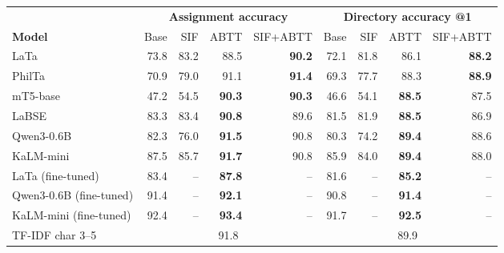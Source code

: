 \begin{table}[t]
\centering
\footnotesize
\setlength{\tabcolsep}{4.5pt}
\begin{tabular}{lrrrrrrrr}
\toprule
& \multicolumn{4}{c}{\textbf{Assignment accuracy}} & \multicolumn{4}{c}{\textbf{Directory accuracy @1}} \\
\cmidrule(lr){2-5}\cmidrule(lr){6-9}
\textbf{Model} & Base & SIF & ABTT & SIF+ABTT & Base & SIF & ABTT & SIF+ABTT \\
\midrule
LaTa & 73.8 & 83.2 & 88.5 & \textbf{90.2} & 72.1 & 81.8 & 86.1 & \textbf{88.2} \\
PhilTa & 70.9 & 79.0 & 91.1 & \textbf{91.4} & 69.3 & 77.7 & 88.3 & \textbf{88.9} \\
mT5-base & 47.2 & 54.5 & \textbf{90.3} & \textbf{90.3} & 46.6 & 54.1 & \textbf{88.5} & 87.5 \\
LaBSE & 83.3 & 83.4 & \textbf{90.8} & 89.6 & 81.5 & 81.9 & \textbf{88.5} & 86.9 \\
Qwen3-0.6B & 82.3 & 76.0 & \textbf{91.5} & 90.8 & 80.3 & 74.2 & \textbf{89.4} & 88.6 \\
KaLM-mini & 87.5 & 85.7 & \textbf{91.7} & 90.8 & 85.9 & 84.0 & \textbf{89.4} & 88.0 \\
\midrule
LaTa (fine-tuned) & 83.4 & -- & \textbf{87.8} & -- & 81.6 & -- & \textbf{85.2} & -- \\
Qwen3-0.6B (fine-tuned) & 91.4 & -- & \textbf{92.1} & -- & 90.8 & -- & \textbf{91.4} & -- \\
KaLM-mini (fine-tuned) & 92.4 & -- & \textbf{93.4} & -- & 91.7 & -- & \textbf{92.5} & -- \\
TF-IDF char 3--5 & \multicolumn{4}{c}{91.8} & \multicolumn{4}{c}{89.9} \\
\bottomrule
\end{tabular}

\end{table}

